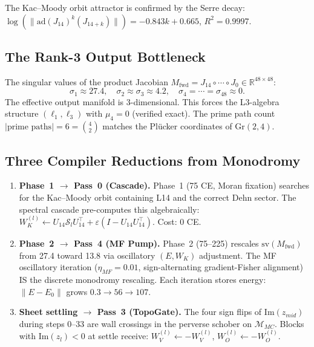 \documentclass[11pt]{amsart}
\begin{document}
The Kac--Moody orbit attractor is confirmed by the Serre decay:
$\log(\|\mathrm{ad}(J_{14})^k(J_{14+k})\|) = -0.843k + 0.665$,
$R^2 = 0.9997$.

\subsection{The Rank-3 Output Bottleneck}

The singular values of the product Jacobian
$M_\mathrm{fwd} = J_{14}\circ\cdots\circ J_0 \in \mathbb{R}^{48\times48}$:
\[
  \sigma_1 \approx 27.4,\quad
  \sigma_2 \approx \sigma_3 \approx 4.2,\quad
  \sigma_4 = \cdots = \sigma_{48} \approx 0.
\]
The effective output manifold is 3-dimensional.
This forces the L3-algebra structure
$(\ell_1,\ell_3)$ with $\mu_4=0$ (verified exact).
The prime path count $|\text{prime paths}| = 6 = \binom{4}{2}$
matches the Pl\"{u}cker coordinates of $\mathrm{Gr}(2,4)$.

\subsection{Three Compiler Reductions from Monodromy}

\begin{enumerate}
  \item \textbf{Phase~1 $\to$ Pass~0 (Cascade).}
    Phase~1 (75 CE, Moran fixation) searches for the Kac--Moody
    orbit containing L14 and the correct Dehn sector.
    The spectral cascade pre-computes this algebraically:
    $W_K^{(l)} \leftarrow U_{14}\mathcal{S}_l U_{14}^\top
    + \varepsilon(I - U_{14}U_{14}^\top)$.
    Cost: 0 CE.

  \item \textbf{Phase~2 $\to$ Pass~4 (MF Pump).}
    Phase~2 (75--225) rescales $\mathrm{sv}(M_\mathrm{fwd})$
    from 27.4 toward 13.8 via oscillatory $(E,W_K)$ adjustment.
    The MF oscillatory iteration ($\eta_{MF}=0.01$, sign-alternating
    gradient-Fisher alignment) IS the discrete monodromy rescaling.
    Each iteration stores energy: $\|E-E_0\|$ grows $0.3\to56\to107$.

  \item \textbf{Sheet settling $\to$ Pass~3 (TopoGate).}
    The four sign flips of $\mathrm{Im}(z_{mid})$ during steps 0--33
    are wall crossings in the perverse schober on $\mathcal{M}_{MC}$.
    Blocks with $\mathrm{Im}(z_l)<0$ at settle receive:
    $W_V^{(l)}\leftarrow -W_V^{(l)}$, $W_O^{(l)}\leftarrow -W_O^{(l)}$.
\end{enumerate}
\end{document}
